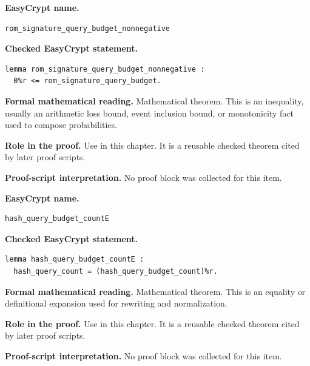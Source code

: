 \begin{formaltheorem}
\noindent\textbf{EasyCrypt name.}
\begin{lstlisting}[language=EasyCrypt,basicstyle=\ttfamily\scriptsize]
rom_signature_query_budget_nonnegative
\end{lstlisting}
\noindent\textbf{Checked EasyCrypt statement.}
\begin{lstlisting}[language=EasyCrypt,basicstyle=\ttfamily\scriptsize]
lemma rom_signature_query_budget_nonnegative :
  0%r <= rom_signature_query_budget.
\end{lstlisting}
\noindent\textbf{Formal mathematical reading.}
Mathematical theorem. This is an inequality, usually an arithmetic loss bound, event inclusion bound, or monotonicity fact used to compose probabilities.

\noindent\textbf{Role in the proof.}
Use in this chapter. It is a reusable checked theorem cited by later proof scripts.

\noindent\textbf{Proof-script interpretation.}
No proof block was collected for this item.

\end{formaltheorem}

\begin{formaltheorem}
\noindent\textbf{EasyCrypt name.}
\begin{lstlisting}[language=EasyCrypt,basicstyle=\ttfamily\scriptsize]
hash_query_budget_countE
\end{lstlisting}
\noindent\textbf{Checked EasyCrypt statement.}
\begin{lstlisting}[language=EasyCrypt,basicstyle=\ttfamily\scriptsize]
lemma hash_query_budget_countE :
  hash_query_count = (hash_query_budget_count)%r.
\end{lstlisting}
\noindent\textbf{Formal mathematical reading.}
Mathematical theorem. This is an equality or definitional expansion used for rewriting and normalization.

\noindent\textbf{Role in the proof.}
Use in this chapter. It is a reusable checked theorem cited by later proof scripts.

\noindent\textbf{Proof-script interpretation.}
No proof block was collected for this item.

\end{formaltheorem}

